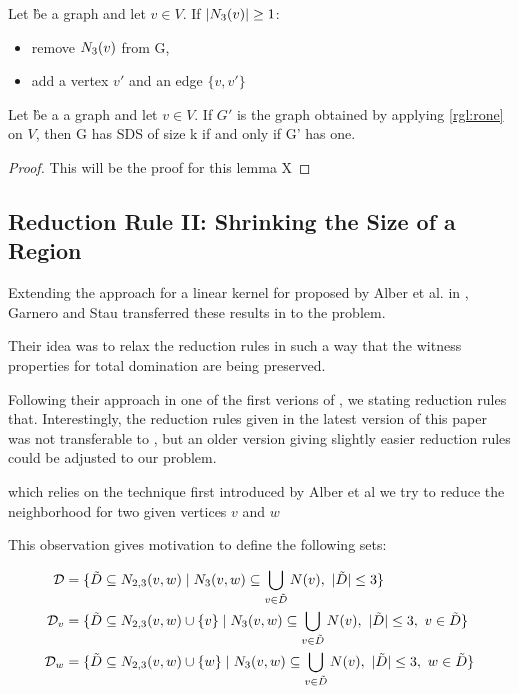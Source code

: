 \begin{rgl}\label{rgl:rone}
    Let \G be a graph and let $v \in V$. If $\abs{N_3(v)} \geq 1$:

    \begin{itemize}
        \item remove $N_3(v)$ from G, 
        \item add a vertex $v'$ and an edge $\{v, v'\}$
    \end{itemize}
     
\end{rgl}
\begin{lemma}
    Let \G be a a graph and let $v \in V$. If $G'$ is the graph obtained by applying \cref{rgl:rone}   on $V$, then G has SDS of size k if and only if G' has one.
\end{lemma}
\begin{proof}
   This will be the proof for this lemma X 
\end{proof}

\subsection{Reduction Rule II: Shrinking the Size of a Region}


Extending the approach for a linear kernel for \dom proposed by Alber et al. in \cite{Alber2004}, Garnero and Stau transferred these results in \cite{Garnero2018} to the \tdom problem. 

Their idea was to relax the reduction rules in such a way that the witness properties for total domination are being preserved.

Following their approach in one of the first verions of \cite{Garnero2014}, we stating reduction rules that. Interestingly, the reduction rules given in the latest version of this paper was not transferable to \sdom, but an older version giving slightly easier reduction rules could be adjusted to our problem.

which relies on the technique first introduced by Alber et al we try to reduce the neighborhood for two given vertices $v$ and $w$

This observation gives motivation to define the following sets:

\begin{align}
    \mathcal{D} &= \{ \tilde D \subseteq N_{2,3}(v,w)            \mid N_3(v,w) \subseteq \bigcup_{v \in \tilde D} N(v),\ |\tilde D| \leq 3                  \}\\
    \mathcal{D}_{v}  &= \{ \tilde D \subseteq N_{2,3}(v,w) \cup \{v\} \mid N_3(v,w) \subseteq \bigcup_{v \in \tilde D} N(v),\ |\tilde D| \leq 3,\ v \in \tilde D \}\\
    \mathcal{D}_{w}  &= \{ \tilde D \subseteq N_{2,3}(v,w) \cup \{w\} \mid N_3(v,w) \subseteq \bigcup_{v \in \tilde D} N(v),\ |\tilde D| \leq 3,\ w \in \tilde D \}
    \end{align}

